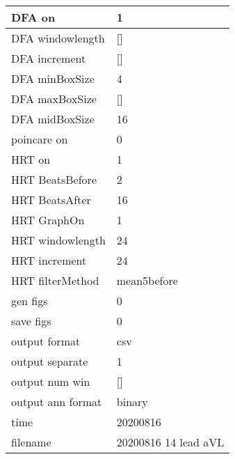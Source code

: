 \begin{tabular}{|l|l|}
DFA on&1\\\hline
DFA windowlength&[]\\\hline
DFA increment&[]\\\hline
DFA minBoxSize&4\\\hline
DFA maxBoxSize&[]\\\hline
DFA midBoxSize&16\\\hline
poincare on&0\\\hline
HRT on&1\\\hline
HRT BeatsBefore&2\\\hline
HRT BeatsAfter&16\\\hline
HRT GraphOn&1\\\hline
HRT windowlength&24\\\hline
HRT increment&24\\\hline
HRT filterMethod&mean5before\\\hline
gen figs&0\\\hline
save figs&0\\\hline
output format&csv\\\hline
output separate&1\\\hline
output num win&[]\\\hline
output ann format&binary\\\hline
time&20200816\\\hline
filename&20200816 14 lead aVL\\\hline
\end{tabular}
